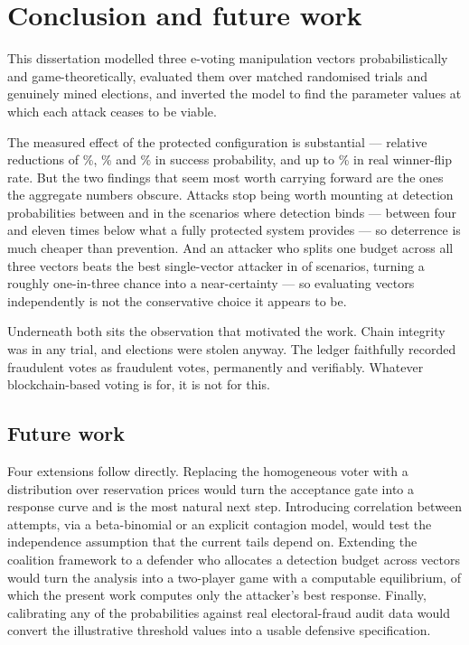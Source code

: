 \documentclass[11pt,a4paper]{article}
\begin{document}
\section{Conclusion and future work}

This dissertation modelled three e-voting manipulation vectors probabilistically and
game-theoretically, evaluated them over \TotalTrials{} matched randomised trials and
\ElectionTrials{} genuinely mined elections, and inverted the model to find the
parameter values at which each attack ceases to be viable.

The measured effect of the protected configuration is substantial --- relative
reductions of \BriberyRelReduction\%, \SybilRelReduction\% and
\BallotStuffingRelReduction\% in success probability, and up to
\FlipBriberyRelReduction\% in real winner-flip rate. But the two findings that seem most
worth carrying forward are the ones the aggregate numbers obscure. Attacks stop being
worth mounting at detection probabilities between \CriticalDetectionMin{} and
\CriticalDetectionMax{} in the \CriticalDetectionBindingCount{} scenarios where detection
binds --- between four and eleven times below what a fully protected system provides ---
so deterrence is much cheaper than prevention. And an attacker who splits one budget
across all three vectors beats the best single-vector attacker in
\CoalitionBetterCount{} of \CoalitionScenarioCount{} scenarios, turning a roughly
one-in-three chance into a near-certainty --- so evaluating vectors independently is not
the conservative choice it appears to be.

Underneath both sits the observation that motivated the work. Chain integrity was
\ChainIntegrityHeld{} in any trial, and elections were stolen anyway. The ledger
faithfully recorded fraudulent votes as fraudulent votes, permanently and verifiably.
Whatever blockchain-based voting is for, it is not for this.

\subsection*{Future work}

Four extensions follow directly. Replacing the homogeneous voter with a distribution
over reservation prices would turn the acceptance gate into a response curve and is the
most natural next step. Introducing correlation between attempts, via a beta-binomial or
an explicit contagion model, would test the independence assumption that the current
tails depend on. Extending the coalition framework to a defender who allocates a
detection budget across vectors would turn the analysis into a two-player game with a
computable equilibrium, of which the present work computes only the attacker's best
response. Finally, calibrating any of the probabilities against real electoral-fraud
audit data would convert the illustrative threshold values into a usable defensive
specification.
\end{document}

